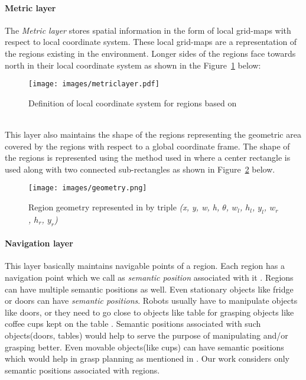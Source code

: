 \paragraph{{Metric layer}}
The \textit{Metric layer} stores spatial information in the form of local grid-maps with respect to local coordinate system.
These local grid-maps are a representation of the regions existing in the environment.
Longer sides of the regions face towards north in their local coordinate system \cite{1} as shown in the Figure~\ref{fig:cs} below:\\ 
\begin{figure}[htbp] %
   \centering
   \texttt{[image: images/metriclayer.pdf]}
   \caption{Definition of local coordinate system for regions based on \cite{1}} 
   \label{fig:cs}
\end{figure}\\
This layer also maintains the shape of the regions representing the geometric area covered by the regions with respect to a global coordinate frame.
The shape of the regions is represented using the method used in \cite{1} where a center rectangle is used along with two connected sub-rectangles as shown in Figure~\ref{fig:geo} below. 
\begin{figure}[htbp] %
   \centering
   \texttt{[image: images/geometry.png]}
   \caption[Region geometry represented by triple \cite{8}]
   {Region geometry represented in \cite{8} by triple \textit{(x, y, w, h, $\theta$, $w_{l}$, $h_{l}$, $y_{l}$, $w_{r}$, $h_{r}$, $y_{r}$)}} 
   \label{fig:geo}
\end{figure}

\paragraph{{Navigation layer}}
This layer basically maintains navigable points of a region.
Each region has a navigation point which we call as \textit{semantic position} associated with it \cite{8}.
Regions can have multiple semantic positions as well. 
Even stationary objects like fridge or doors can have \textit{semantic positions}. Robots usually have to manipulate objects like doors,
or they need to go close to 
objects like table for grasping objects like coffee cups kept on the table . 
Semantic positions associated with such objects(doors, tables) would help to serve the purpose of manipulating and/or grasping better.
Even movable objects(like cups) can have semantic positions which would help in grasp planning as mentioned in \cite{18}. 
Our work considers only semantic positions associated with regions.\\

